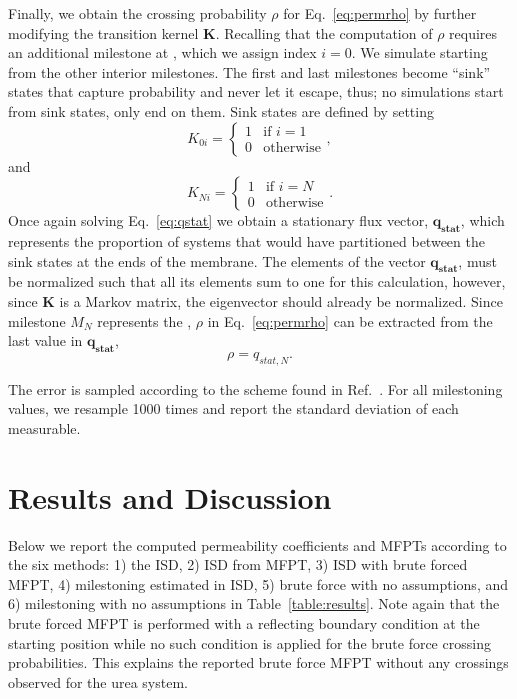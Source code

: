         \par Finally, we obtain the crossing probability $\rho$ for Eq.~\ref{eq:permrho} by further modifying the transition kernel $\mathbf{K}$. Recalling that the computation of $\rho$ requires an additional milestone at , which we assign index $i = 0$. We simulate starting from the other interior milestones. The first and last milestones become ``sink'' states that capture probability and never let it escape, thus; no simulations start from sink states, only end on them. Sink states are defined by setting
        \begin{equation}
            K_{0i} = \begin{cases}
                1 & \text{if } i = 1\\
                0 & \text{otherwise}
            \end{cases},
        \end{equation}
        and
        \begin{equation}
            K_{Ni} = \begin{cases}
                1 & \text{if } i = N\\
                0 & \text{otherwise}
            \end{cases}.
        \end{equation}
        Once again solving Eq.~\ref{eq:qstat} we obtain a stationary flux vector, $\mathbf{q_{stat}}$, which represents the proportion of systems that would have partitioned between the sink states at the ends of the membrane. The elements of the vector $\mathbf{q_{stat}}$, must be normalized such that all its elements sum to one for this calculation, however, since $\mathbf{K}$ is a Markov matrix, the eigenvector should already be normalized. Since milestone $M_N$ represents the , $\rho$ in Eq.~\ref{eq:permrho} can be extracted from the last value in $\mathbf{q_{stat}}$,
        \begin{equation}
            \rho = q_{stat,N}.
        \end{equation}

        \par The error is sampled according to the scheme found in Ref.~. For all milestoning values, we resample 1000 times and report the standard deviation of each measurable.
\clearpage{}

    \clearpage{}\section*{Results and Discussion}
    \par Below we report the computed permeability coefficients and MFPTs according to the six methods: 1) the ISD, 2) ISD from MFPT, 3) ISD with brute forced MFPT, 4) milestoning estimated \mfpt in ISD, 5) brute force with no assumptions, and 6) milestoning with no assumptions in Table~\ref{table:results}. Note again that the brute forced MFPT is performed with a reflecting boundary condition at the starting position while no such condition is applied for the brute force crossing probabilities. This explains the reported brute force MFPT without any crossings observed for the urea system.


